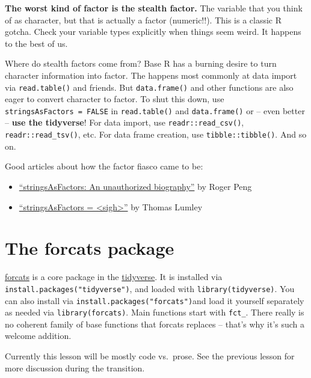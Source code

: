 \documentclass[
]{book}
\providecommand{\tightlist}{%
  \setlength{\itemsep}{0pt}\setlength{\parskip}{0pt}}
\begin{document}
\textbf{The worst kind of factor is the stealth factor.} The variable that you think of as character, but that is actually a factor (numeric!!). This is a classic R gotcha. Check your variable types explicitly when things seem weird. It happens to the best of us.

Where do stealth factors come from? Base R has a burning desire to turn character information into factor. The happens most commonly at data import via \texttt{read.table()} and friends. But \texttt{data.frame()} and other functions are also eager to convert character to factor. To shut this down, use \texttt{stringsAsFactors\ =\ FALSE} in \texttt{read.table()} and \texttt{data.frame()} or -- even better -- \textbf{use the tidyverse}! For data import, use \texttt{readr::read\_csv()}, \texttt{readr::read\_tsv()}, etc. For data frame creation, use \texttt{tibble::tibble()}. And so on.

Good articles about how the factor fiasco came to be:

\begin{itemize}
\tightlist
\item
  \href{https://simplystatistics.org/2015/07/24/stringsasfactors-an-unauthorized-biography}{``stringsAsFactors: An unauthorized biography''} by Roger Peng
\item
  \href{https://notstatschat.tumblr.com/post/124987394001/stringsasfactors-sigh}{``stringsAsFactors = \textless sigh\textgreater{}''} by Thomas Lumley
\end{itemize}

\hypertarget{the-forcats-package}{%
\section{The forcats package}\label{the-forcats-package}}

\href{https://forcats.tidyverse.org}{forcats} is a core package in the \href{https://tidyverse.tidyverse.org}{tidyverse}. It is installed via \texttt{install.packages("tidyverse")}, and loaded with \texttt{library(tidyverse)}. You can also install via \texttt{install.packages("forcats")}and load it yourself separately as needed via \texttt{library(forcats)}. Main functions start with \texttt{fct\_}. There really is no coherent family of base functions that forcats replaces -- that's why it's such a welcome addition.

Currently this lesson will be mostly code vs.~prose. See the previous lesson for more discussion during the transition.
\end{document}
